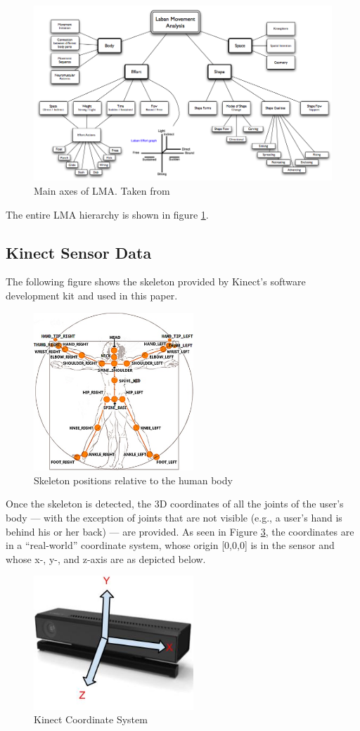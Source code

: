 \documentclass[11pt,twocolumn,varwidth=true,a4paper,fleqn]{article}
\begin{document}
\begin{figure}[ht]
\centering
\includegraphics[width=\textwidth]{laban.png}
\caption{Main axes of LMA. Taken from \cite{labanTree}}
\label{labanTree}
\end{figure}
The entire LMA hierarchy is shown in figure \ref{labanTree}.

\subsection{Kinect Sensor Data}
The following figure shows the skeleton provided by Kinect's
software development kit and used in this paper.
\begin{figure}[h]
\centering
\includegraphics[width=60mm]{skeleton.jpg}
\caption{Skeleton positions relative to the human body}
\label{skeleton}
\end{figure}
Once the skeleton is detected, the 3D coordinates of all the joints of the
user's body --- with the exception of joints that are not visible (e.g., a user's
hand is behind his or her back) --- are provided.
As seen in Figure \ref{Coordinate}, the coordinates are in a ``real-world''
coordinate system, whose origin [0,0,0] is in the sensor and whose x-, y-, and
z-axis are as depicted below.
\begin{figure}[h]
\centering
\includegraphics[width=60mm]{KinectV2CoordinateSystem.jpg}
\caption{Kinect Coordinate System}
\label{Coordinate}
\end{figure}
\end{document}
